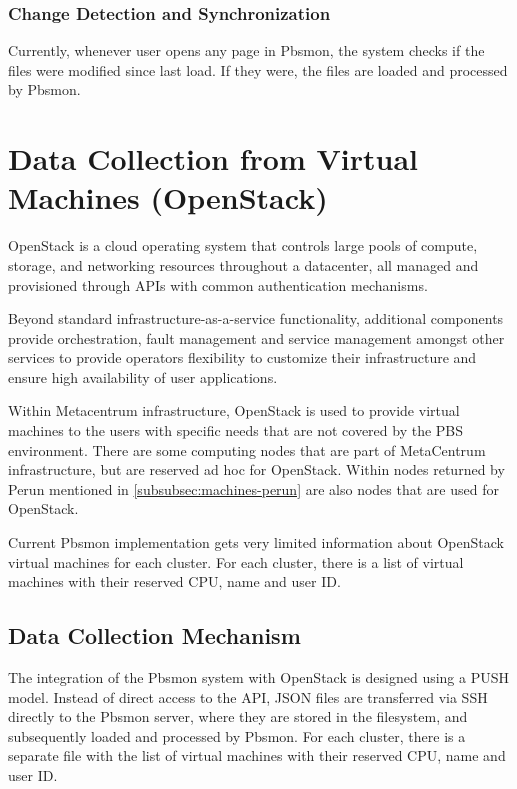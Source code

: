 \documentclass[
  digital,     %
  oneside,     %
  nosansbold,  %
  nocolorbold, %
  lof,         %
  lot,         %
]{fithesis4}
\begin{document}
\subsubsection{Change Detection and Synchronization}
Currently, whenever user opens any page in Pbsmon, the system checks if the files were modified since last load. If they were, the files are loaded and processed by Pbsmon.


\newpage 
\section{Data Collection from Virtual Machines (OpenStack)}
OpenStack is a cloud operating system that controls large pools of compute, storage, and networking resources throughout a datacenter, all managed and provisioned through APIs with common authentication mechanisms. \cite{openstack2025}

Beyond standard infrastructure-as-a-service functionality, additional components provide orchestration, fault management and service management amongst other services to provide operators flexibility to customize their infrastructure and ensure high availability of user applications. \cite{openstack2025}

Within Metacentrum infrastructure, OpenStack is used to provide virtual machines to the users with specific needs that are not covered by the PBS environment. There are some computing nodes that are part of MetaCentrum infrastructure, but are reserved ad hoc for OpenStack. Within nodes returned by Perun mentioned in \ref{subsubsec:machines-perun} are also nodes that are used for OpenStack.

Current Pbsmon implementation gets very limited information about OpenStack virtual machines for each cluster. For each cluster, there is a list of virtual machines with their reserved CPU, name and user ID.

 
\subsection{Data Collection Mechanism}
\label{subsec:data-collection-mechanism-openstack}

The integration of the Pbsmon system with OpenStack is designed using a PUSH model. Instead of direct access to the API, JSON files are transferred via SSH directly to the Pbsmon server, where they are stored in the filesystem, and subsequently loaded and processed by Pbsmon. For each cluster, there is a separate file with the list of virtual machines with their reserved CPU, name and user ID. 
\end{document}
